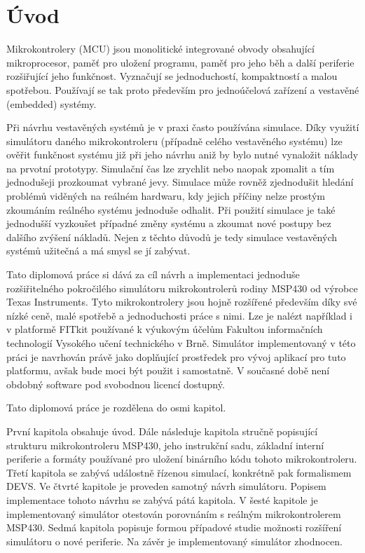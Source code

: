 \chapter{Úvod}

Mikrokontrolery (MCU) jsou monolitické integrované obvody obsahující mikroprocesor, paměť pro uložení programu, paměť pro jeho běh a další periferie
rozšiřující jeho funkčnost. Vyznačují se jednoduchostí, kompaktností a malou spotřebou. Používají se tak proto především pro jednoúčelová zařízení a 
vestavěné (embedded) systémy.

Při návrhu vestavěných systémů je v praxi často používána simulace. Díky využití simulátoru daného mikrokontroleru (případně celého vestavěného systému) lze ověřit funkčnost systému již při jeho návrhu aniž by bylo nutné vynaložit náklady na prvotní prototypy. Simulační čas lze zrychlit nebo naopak zpomalit a tím jednodušeji prozkoumat vybrané jevy. Simulace může rovněž zjednodušit hledání problémů viděných na reálném hardwaru, kdy jejich příčiny nelze prostým zkoumáním reálného systému jednoduše odhalit. Při použití simulace je také jednodušší vyzkoušet případné změny systému a zkoumat nové postupy bez dalšího zvýšení nákladů. Nejen z těchto důvodů je tedy simulace vestavěných systémů užitečná a má smysl se jí zabývat.

Tato diplomová práce si dává za cíl návrh a implementaci jednoduše rozšiřitelného pokročilého simulátoru mikrokontrolerů rodiny MSP430 od výrobce Texas Instruments. Tyto mikrokontrolery jsou hojně rozšířené především díky své nízké ceně, malé spotřebě a jednoduchosti práce s nimi. Lze je nalézt například i v platformě FITkit používané k výukovým účelům Fakultou informačních technologií Vysokého učení technického v Brně. Simulátor implementovaný v této práci je navrhován právě jako doplňující prostředek pro vývoj aplikací pro tuto platformu, avšak bude moci být použit i samostatně. V současné době není obdobný software pod svobodnou licencí dostupný.

Tato diplomová práce je rozdělena do osmi kapitol.

První kapitola obsahuje úvod. Dále následuje kapitola stručně popisující strukturu mikrokontroleru MSP430, jeho instrukční sadu, základní interní periferie a formáty používané pro uložení binárního kódu tohoto mikrokontroleru. Třetí kapitola se zabývá událostně řízenou simulací, konkrétně pak formalismem DEVS. Ve čtvrté kapitole je proveden samotný návrh simulátoru. Popisem implementace tohoto návrhu se zabývá pátá kapitola. V šesté kapitole je implementovaný simulátor otestován porovnáním s reálným mikrokontrolerem MSP430. Sedmá kapitola popisuje formou případové studie možnosti rozšíření simulátoru o nové periferie. Na závěr je implementovaný simulátor zhodnocen.

